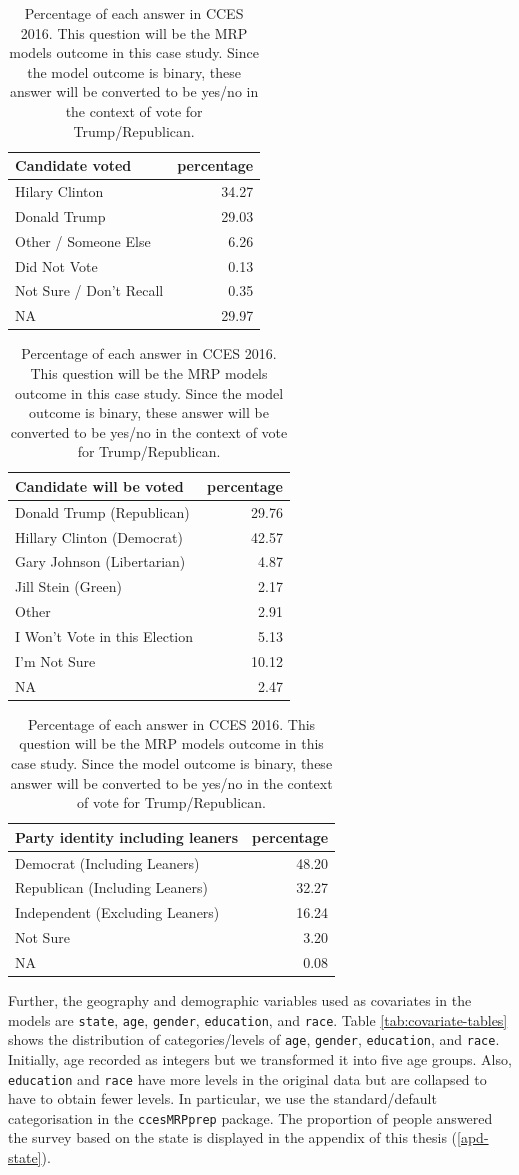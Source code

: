 \documentclass{monashthesis}
\begin{document}
\begin{table}
\caption{\label{tab:outcome-table}Percentage of each answer in CCES 2016. This question will be the MRP models outcome in this case study. Since the model outcome is binary, these answer will be converted to be yes/no in the context of vote for Trump/Republican.}

\centering
\begin{tabular}[t]{lr}
\toprule
Candidate voted & percentage\\
\midrule
Hilary Clinton & 34.27\\
Donald Trump & 29.03\\
Other / Someone Else & 6.26\\
Did Not Vote & 0.13\\
Not Sure / Don't Recall & 0.35\\
\addlinespace
NA & 29.97\\
\bottomrule
\end{tabular}
\centering
\begin{tabular}[t]{lr}
\toprule
Candidate will be voted & percentage\\
\midrule
Donald Trump (Republican) & 29.76\\
Hillary Clinton (Democrat) & 42.57\\
Gary Johnson (Libertarian) & 4.87\\
Jill Stein (Green) & 2.17\\
Other & 2.91\\
\addlinespace
I Won't Vote in this Election & 5.13\\
I'm Not Sure & 10.12\\
NA & 2.47\\
\bottomrule
\end{tabular}
\centering
\begin{tabular}[t]{lr}
\toprule
Party identity including leaners & percentage\\
\midrule
Democrat (Including Leaners) & 48.20\\
Republican (Including Leaners) & 32.27\\
Independent (Excluding Leaners) & 16.24\\
Not Sure & 3.20\\
NA & 0.08\\
\bottomrule
\end{tabular}
\end{table}

Further, the geography and demographic variables used as covariates in the models are \texttt{state}, \texttt{age}, \texttt{gender}, \texttt{education}, and \texttt{race}. Table \ref{tab:covariate-tables} shows the distribution of categories/levels of \texttt{age}, \texttt{gender}, \texttt{education}, and \texttt{race}. Initially, age recorded as integers but we transformed it into five age groups. Also, \texttt{education} and \texttt{race} have more levels in the original data but are collapsed to have to obtain fewer levels. In particular, we use the standard/default categorisation in the \texttt{ccesMRPprep} package. The proportion of people answered the survey based on the state is displayed in the appendix of this thesis (\ref{apd-state}).
\end{document}
